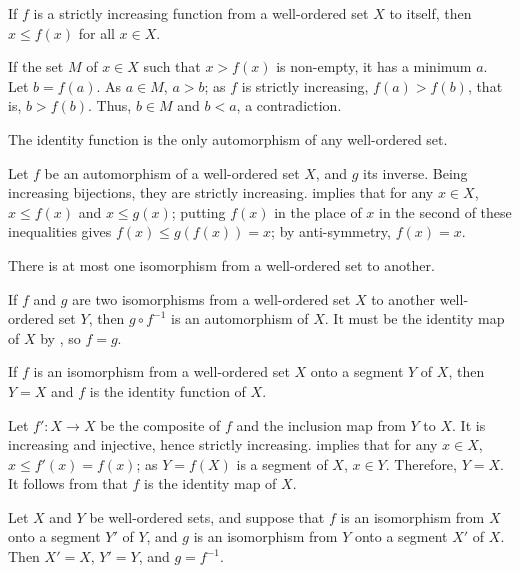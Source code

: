 \documentclass{article}
\begin{document}
\begin{theorem}
  \label{thm:hw1jxum0}
  If \(f\) is a strictly increasing function from a well-ordered set
  \(X\) to itself, then \(x \leq f(x)\) for all \(x \in X\).
\end{theorem}

If the set \(M\) of \(x \in X\) such that \(x > f(x)\) is non-empty,
it has a minimum \(a\).  Let \(b = f(a)\).  As \(a \in M\), \(a > b\);
as \(f\) is strictly increasing, \(f(a) > f(b)\), that is,
\(b > f(b)\).  Thus, \(b \in M\) and \(b < a\), a contradiction.

\begin{theorem}
  \label{thm:yvftewxp}
  The identity function is the only automorphism of any well-ordered
  set.
\end{theorem}

Let \(f\) be an automorphism of a well-ordered set \(X\), and \(g\)
its inverse.  Being increasing bijections, they are strictly
increasing.   implies that for any \(x \in X\),
\(x \leq f(x)\) and \(x \leq g(x)\); putting \(f(x)\) in the place of
\(x\) in the second of these inequalities gives
\(f(x) \leq g(f(x)) = x\); by anti-symmetry, \(f(x) = x\).

\begin{theorem}
  \label{thm:uvocd4lt}
  There is at most one isomorphism from a well-ordered set to another.
\end{theorem}

If \(f\) and \(g\) are two isomorphisms from a well-ordered set \(X\)
to another well-ordered set \(Y\), then \(g \circ f^{-1}\) is an
automorphism of \(X\).  It must be the identity map of \(X\) by
, so \(f = g\).

\begin{theorem}
  \label{thm:q14zcdkw}
  If \(f\) is an isomorphism from a well-ordered set \(X\) onto a
  segment \(Y\) of \(X\), then \(Y = X\) and \(f\) is the identity
  function of \(X\).
\end{theorem}

Let \(f' : X \to X\) be the composite of \(f\) and the inclusion map
from \(Y\) to \(X\).  It is increasing and injective, hence strictly
increasing.   implies that for any \(x \in X\),
\(x \leq f'(x) = f(x)\); as \(Y = f(X)\) is a segment of \(X\),
\(x \in Y\).  Therefore, \(Y = X\).  It follows from
 that \(f\) is the identity map of \(X\).

\begin{theorem}
  \label{thm:7z7bwher}
  Let \(X\) and \(Y\) be well-ordered sets, and suppose that \(f\) is
  an isomorphism from \(X\) onto a segment \(Y'\) of \(Y\), and \(g\)
  is an isomorphism from \(Y\) onto a segment \(X'\) of \(X\).  Then
  \(X' = X\), \(Y' = Y\), and \(g = f^{-1}\).
\end{theorem}
\end{document}
